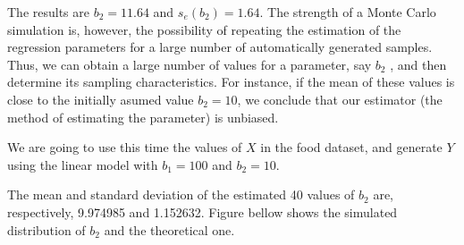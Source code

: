 \documentclass[
]{book}
\newenvironment{Shaded}{\begin{snugshade}}{\end{snugshade}}
\newcommand{\AttributeTok}[1]{\textcolor[rgb]{0.13,0.29,0.53}{#1}}
\newcommand{\CommentTok}[1]{\textcolor[rgb]{0.56,0.35,0.01}{\textit{#1}}}
\newcommand{\ControlFlowTok}[1]{\textcolor[rgb]{0.13,0.29,0.53}{\textbf{#1}}}
\newcommand{\DecValTok}[1]{\textcolor[rgb]{0.00,0.00,0.81}{#1}}
\newcommand{\FunctionTok}[1]{\textcolor[rgb]{0.13,0.29,0.53}{\textbf{#1}}}
\newcommand{\NormalTok}[1]{#1}
\newcommand{\OtherTok}[1]{\textcolor[rgb]{0.56,0.35,0.01}{#1}}
\newcommand{\SpecialCharTok}[1]{\textcolor[rgb]{0.81,0.36,0.00}{\textbf{#1}}}
\newcommand{\StringTok}[1]{\textcolor[rgb]{0.31,0.60,0.02}{#1}}
\begin{document}
The results are \(b_2=11.64\) and \(s_e(b_2)=1.64\). The strength of a Monte Carlo simulation is, however, the possibility of repeating the estimation of the regression parameters for a large number of automatically generated samples. Thus, we can obtain a large number of values for a parameter, say \(b_2\) , and then determine its sampling characteristics. For instance, if the mean of these values is close to the initially asumed value \(b_2= 10\), we conclude that our estimator (the method of estimating the parameter) is unbiased.

We are going to use this time the values of \(X\) in the food dataset, and generate \(Y\) using the linear model with \(b_1=100\) and \(b_2= 10.\)

\begin{Shaded}
\end{Shaded}

The mean and standard deviation of the estimated 40 values of \(b_2\) are, respectively, 9.974985 and 1.152632. Figure bellow shows the simulated distribution of \(b_2\) and the theoretical one.
\end{document}

